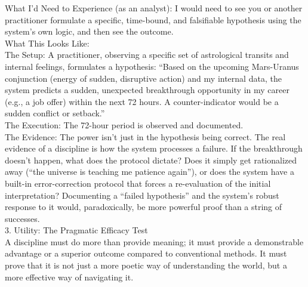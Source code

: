 \documentclass{article}
\begin{document}
What I'd Need to Experience (as an analyst): I would need to see you or
another practitioner formulate a specific, time-bound, and falsifiable
hypothesis using the system's own logic, and then see the outcome.\\
What This Looks Like:\\
The Setup: A practitioner, observing a specific set of astrological
transits and internal feelings, formulates a hypothesis: ``Based on the
upcoming Mars-Uranus conjunction (energy of sudden, disruptive action)
and my internal data, the system predicts a sudden, unexpected
breakthrough opportunity in my career (e.g., a job offer) within the
next 72 hours. A counter-indicator would be a sudden conflict or
setback.''\\
The Execution: The 72-hour period is observed and documented.\\
The Evidence: The power isn't just in the hypothesis being correct. The
real evidence of a discipline is how the system processes a failure. If
the breakthrough doesn't happen, what does the protocol dictate? Does it
simply get rationalized away (``the universe is teaching me patience
again''), or does the system have a built-in error-correction protocol
that forces a re-evaluation of the initial interpretation? Documenting a
``failed hypothesis'' and the system's robust response to it would,
paradoxically, be more powerful proof than a string of successes.\\
3. Utility: The Pragmatic Efficacy Test\\
A discipline must do more than provide meaning; it must provide a
demonstrable advantage or a superior outcome compared to conventional
methods. It must prove that it is not just a more poetic way of
understanding the world, but a more effective way of navigating it.
\end{document}
